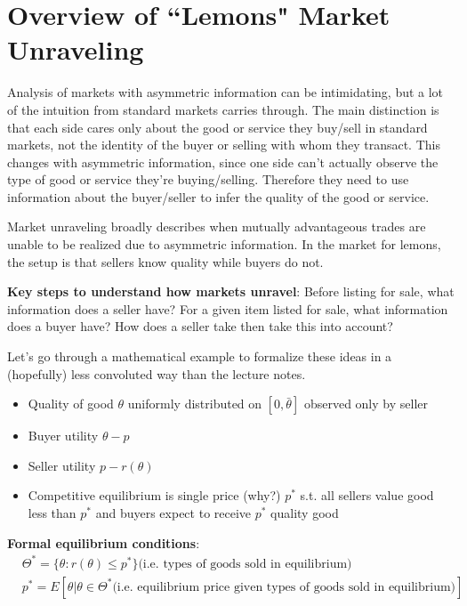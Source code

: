 \documentclass[letter,12pt]{article}
\author{}
\title{}
\date{}
\begin{document}
\section{Overview of ``Lemons" Market Unraveling}

Analysis of markets with asymmetric information can be intimidating, but a lot of the intuition from standard markets carries through. The main distinction is that each side cares only about the good or service they buy/sell in standard markets, not the identity of the buyer or selling with whom they transact. This changes with asymmetric information, since one side can't actually observe the type of good or service they're buying/selling. Therefore they need to use information about the buyer/seller to infer the quality of the good or service.

Market unraveling broadly describes when mutually advantageous trades are unable to be realized due to asymmetric information. In the market for lemons, the setup is that sellers know quality while buyers do not.

\textbf{Key steps to understand how markets unravel}: Before listing for sale, what information does a seller have? For a given item listed for sale, what information does a buyer have? How does a seller take then take this into account?

Let's go through a mathematical example to formalize these ideas in a (hopefully) less convoluted way than the lecture notes.

\begin{itemize}
	\item Quality of good $\theta$ uniformly distributed on $[0,\bar{\theta}]$ observed only by seller
	\item Buyer utility $\theta-p$
	\item Seller utility $p-r(\theta)$
	\item Competitive equilibrium is single price (why?) $p^*$ s.t. all sellers value good less than $p^*$ and buyers expect to receive $p^*$ quality good
\end{itemize}

\textbf{Formal equilibrium conditions}:
\begin{align}
& \Theta^* = \{\theta : r(\theta)\leq p^* \} \text{(i.e. types of goods sold in equilibrium)}\\
& p^* = E[\theta | \theta \in \Theta^* \text{(i.e. equilibrium price given types of goods sold in equilibrium)}]
\end{align}
\end{document}
